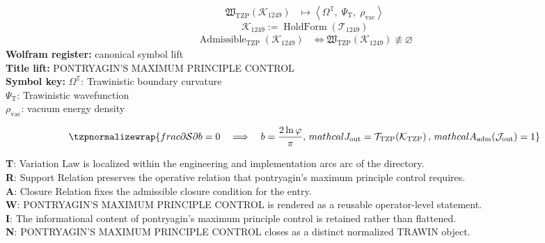 \noindent
\begin{minipage}[t]{0.48\linewidth}
\begingroup
\small
\[
\begin{aligned}
\mathfrak{W}_{\mathrm{TZP}}\!\left(\mathcal{K}_{1249}\right)
&\longmapsto
\left\langle \Omega^{\mathbb{T}},\; \Psi_{\mathrm{T}},\; \rho_{\mathrm{vac}} \right\rangle
\end{aligned}
\]
\[
\mathcal{K}_{1249}
:=
\operatorname{HoldForm}\!\left(\mathcal{T}_{1249}\right)
\]
\[
\begin{aligned}
\operatorname{Admissible}_{\mathrm{TZP}}\!\left(\mathcal{K}_{1249}\right)
&\Longleftrightarrow
\mathfrak{W}_{\mathrm{TZP}}\!\left(\mathcal{K}_{1249}\right)\not\equiv\varnothing
\end{aligned}
\]
\textbf{Wolfram register:} canonical symbol lift\\
\textbf{Title lift:} PONTRYAGIN'S MAXIMUM PRINCIPLE CONTROL\\
\textbf{Symbol key:} \(\Omega^{\mathbb{T}}\): Trawinistic boundary curvature\\ \(\Psi_{\mathrm{T}}\): Trawinistic wavefunction\\ \(\rho_{\mathrm{vac}}\): vacuum energy density
\par
\endgroup
\end{minipage}\hfill
\begin{minipage}[t]{0.48\linewidth}
\[
\tzpnormalizewrap{frac{\partial \mathcal{S}}{\partial b} = 0 \quad\Longrightarrow\quad b = \frac{2\ln \varphi}{\pi},\,mathcal{J}_{\mathrm{out}} = \mathcal{T}_{\mathrm{TZP}}\!\left(\mathcal{K}_{\mathrm{TZP}}\right),\,mathcal{A}_{\mathrm{adm}}\!\left(\mathcal{J}_{\mathrm{out}}\right)=1}
\]

\small
\textbf{T}: Variation Law is localized within the engineering and implementation arcs arc of the directory.\\
\textbf{R}: Support Relation preserves the operative relation that pontryagin's maximum principle control requires.\\
\textbf{A}: Closure Relation fixes the admissible closure condition for the entry.\\
\textbf{W}: PONTRYAGIN'S MAXIMUM PRINCIPLE CONTROL is rendered as a reusable operator-level statement.\\
\textbf{I}: The informational content of pontryagin's maximum principle control is retained rather than flattened.\\
\textbf{N}: PONTRYAGIN'S MAXIMUM PRINCIPLE CONTROL closes as a distinct normalized TRAWIN object.
\normalsize
\end{minipage}

